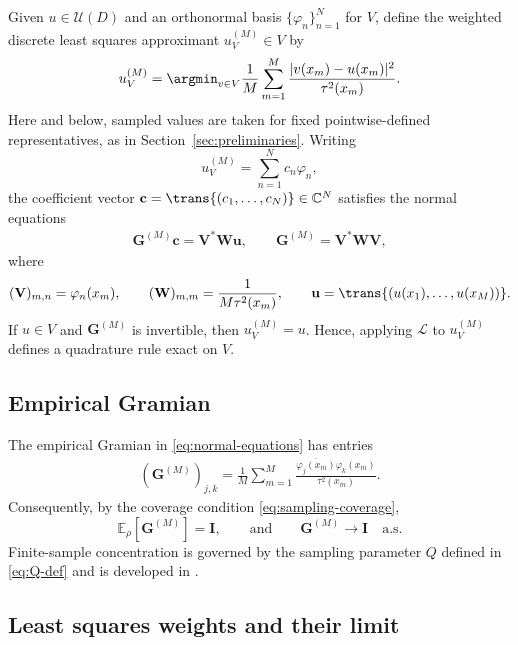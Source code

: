 \documentclass[10pt,dvipsnames]{amsart}
\begin{document}
Given \(u\in\mathcal U(D)\) and an orthonormal basis
\(\{\varphi_n\}_{n=1}^N\) for \(V\), define the weighted discrete least
squares approximant \(u_V^{(M)}\in V\) by
\begin{align}
    \label{eq:wls-functional}
    u_V^{(M)}
    =
    \argmin_{v\in V}
    \frac{1}{M}\sum_{m=1}^M
    \frac{|v(x_m)-u(x_m)|^2}{\tau^2(x_m)}.
\end{align}
Here and below, sampled values are taken for fixed pointwise-defined
representatives, as in Section~\ref{sec:preliminaries}. Writing
\[
    u_V^{(M)}=\sum_{n=1}^N c_n\varphi_n,
\]
the coefficient vector $\mathbf c=\trans{(c_1,\ldots,c_N)}\in\mathbb C^N$ satisfies the normal equations
\begin{align}
    \label{eq:normal-equations}
    \mathbf G^{(M)}\mathbf c
    =
    \mathbf V^*\mathbf W\mathbf u,
    \qquad
    \mathbf G^{(M)}
    =
    \mathbf V^*\mathbf W\mathbf V,
\end{align}
where
\begin{align}
    \label{eq:V-W-def}
    (\mathbf V)_{m,n}=\varphi_n(x_m),
    \qquad
    (\mathbf W)_{m,m}=\frac{1}{M\tau^2(x_m)},
    \qquad
    \mathbf u=\trans{(u(x_1),\ldots,u(x_M))}.
\end{align}
If $u\in V$ and $\mathbf G^{(M)}$ is invertible, then $u_V^{(M)}=u$. Hence, applying \(\mathcal L\) to \(u_V^{(M)}\)
defines a quadrature rule exact on \(V\).

\subsection{Empirical Gramian}

The empirical Gramian in \eqref{eq:normal-equations} has entries
\begin{align}
    \label{eq:GM-def}
    (\mathbf G^{(M)})_{j,k}
    =
    \frac{1}{M}\sum_{m=1}^M
    \frac{\overline{\varphi_j(x_m)}\varphi_k(x_m)}
    {\tau^2(x_m)}.
\end{align}
Consequently, by the coverage condition \eqref{eq:sampling-coverage},
\begin{equation}\label{eq:G-asymptotic}
    \mathbb E_\rho[\mathbf G^{(M)}]=\mathbf I,
    \qquad
    \text{and}
    \qquad
    \mathbf G^{(M)}\longrightarrow\mathbf I
    \quad\text{a.s}.
\end{equation}
Finite-sample concentration is governed by the sampling parameter \(Q\) defined in \eqref{eq:Q-def} and is developed in .

\subsection{Least squares weights and their limit}\label{ssec:ls-weights}
\end{document}
